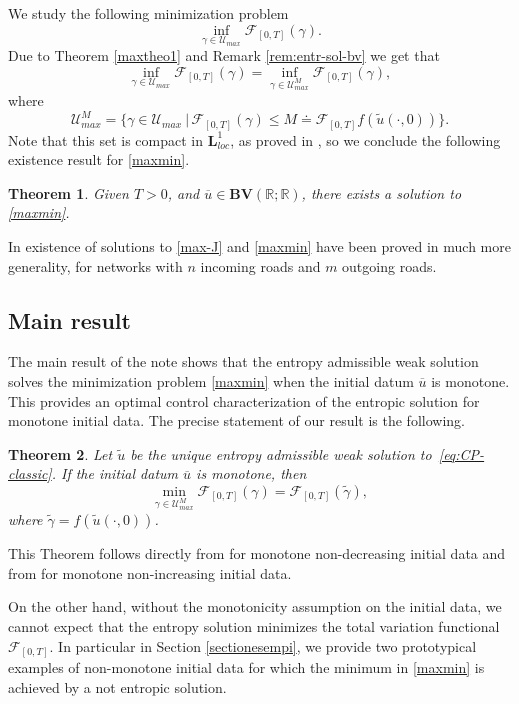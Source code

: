 \documentclass[a4paper, 10pt, final]{article}
\newtheorem{theorem}{Theorem}[section]
\newcommand{\R}{\mathbb{R}} \newcommand{\N}{\mathbb{N}}
\begin{document}
 
We study the  following minimization problem
\begin{equation}\label{maxmin}
  \inf_{\gamma \in {\mathcal{U}}_{max}} \mathcal F_{[0, T]}(\gamma).
\end{equation}  
Due to Theorem \ref{maxtheo1} and Remark 
 \ref{rem:entr-sol-bv}
we get that \[
  \inf_{\gamma \in {\mathcal{U}}_{max}} \mathcal F_{[0, T]}(\gamma)=
  \inf_{\gamma \in {\mathcal{U}}_{max}^M} \mathcal F_{[0, T]}(\gamma),
\] where \[
 \mathcal{U}^M_{max} 
  = \Big\{  \gamma\in \mathcal{U}_{max}\ \big|\,  \mathcal{F}_{[0,T]} (\gamma)\leq M\doteq\mathcal{F}_{[0,T]} 
  f(\widetilde u(\cdot, 0))\Big\}.
\]
Note that this set is compact  in $\mathbf{L}^1_{loc}$, as proved in \cite{accg}, 
so  we conclude the following existence result for \eqref{maxmin}.
\begin{theorem} 
  Given $T>0$, and $\overline u\in 
  \mathbf{BV}(\R;\R)$, there exists a solution to \eqref{maxmin}. 
\end{theorem} 

In \cite{accg} existence of solutions to \eqref{max-J} and \eqref{maxmin} have been proved in much more generality, 
for networks with $n$ incoming roads and $m$ outgoing roads.

\subsection{Main result} 
The  main result of the note shows that    the  entropy admissible weak solution  solves the minimization problem \eqref{maxmin} when the initial datum $\overline u$ is monotone. This provides an optimal control characterization of the entropic solution for monotone initial data. The precise statement of our result is the following.
\begin{theorem}
Let $\widetilde u$ be the unique entropy  admissible weak solution
to~\eqref{eq:CP-classic}. 
If the initial datum $\overline u$  is monotone, then
\[  \min_{\gamma \in {\mathcal{U}}^M_{max}} \mathcal F_{[0, T]}(\gamma)= \mathcal F_{[0,T]} (\widetilde \gamma),   \] where $\widetilde \gamma= f(\widetilde u(\cdot, 0))$. 
\end{theorem} 
This   Theorem follows directly from  for monotone non-decreasing initial data and from  
for monotone non-increasing initial data. 



On the other hand, without the monotonicity assumption on the initial data, we cannot expect that the entropy 
solution minimizes the total variation functional $\mathcal F_{[0, T]}$. In particular in Section  \ref{sectionesempi}, 
we provide two prototypical examples of non-monotone initial data for which the minimum in \eqref{maxmin} 
is achieved by a   not entropic solution.
\end{document}
